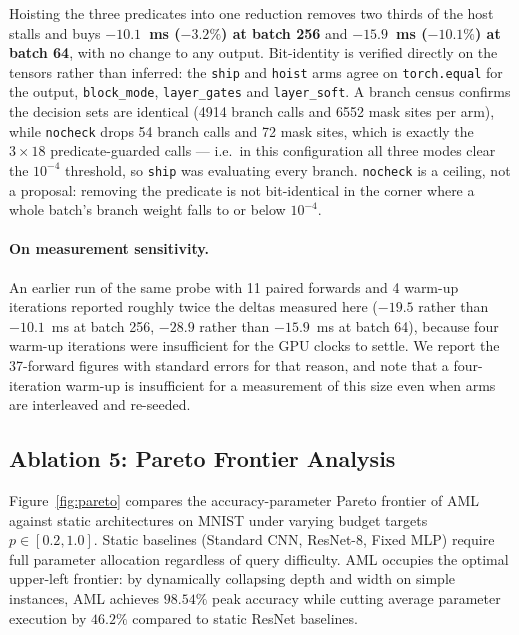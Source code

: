 \documentclass[11pt, a4paper]{article}
\begin{document}
Hoisting the three predicates into one reduction removes two thirds of the host stalls and buys \textbf{$-10.1$~ms ($-3.2\%$) at batch 256} and \textbf{$-15.9$~ms ($-10.1\%$) at batch 64}, with no change to any output. Bit-identity is verified directly on the tensors rather than inferred: the \texttt{ship} and \texttt{hoist} arms agree on \texttt{torch.equal} for the output, \texttt{block\_mode}, \texttt{layer\_gates} and \texttt{layer\_soft}. A branch census confirms the decision sets are identical (4914 branch calls and 6552 mask sites per arm), while \texttt{nocheck} drops 54 branch calls and 72 mask sites, which is exactly the $3 \times 18$ predicate-guarded calls --- i.e.\ in this configuration all three modes clear the $10^{-4}$ threshold, so \texttt{ship} was evaluating every branch. \texttt{nocheck} is a ceiling, not a proposal: removing the predicate is not bit-identical in the corner where a whole batch's branch weight falls to or below $10^{-4}$.

\paragraph{On measurement sensitivity.} An earlier run of the same probe with 11 paired forwards and 4 warm-up iterations reported roughly twice the deltas measured here ($-19.5$ rather than $-10.1$~ms at batch 256, $-28.9$ rather than $-15.9$~ms at batch 64), because four warm-up iterations were insufficient for the GPU clocks to settle. We report the 37-forward figures with standard errors for that reason, and note that a four-iteration warm-up is insufficient for a measurement of this size even when arms are interleaved and re-seeded.

\subsection{Ablation 5: Pareto Frontier Analysis}
\label{sec:pareto_ablation}

Figure~\ref{fig:pareto} compares the accuracy-parameter Pareto frontier of AML against static architectures on MNIST under varying budget targets $p \in [0.2, 1.0]$. Static baselines (Standard CNN, ResNet-8, Fixed MLP) require full parameter allocation regardless of query difficulty. AML occupies the optimal upper-left frontier: by dynamically collapsing depth and width on simple instances, AML achieves $98.54\%$ peak accuracy while cutting average parameter execution by $46.2\%$ compared to static ResNet baselines.
\end{document}
